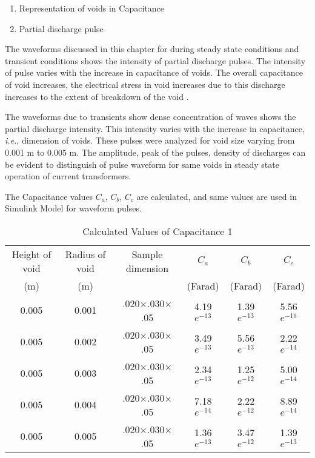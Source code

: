 \begin{enumerate}
\item Representation of voids in Capacitance 
\item Partial discharge pulse 
\end{enumerate}

The waveforms discussed in this chapter for during steady state conditions and transient conditions shows the intensity of partial discharge pulses. The intensity of pulse varies with the increase in capacitance of voids. The overall capacitance of void increases, the electrical stress in void increases due to this discharge increases to the extent of breakdown of the void \cite{bengtsson1997procedure}.

The waveforms due to transients show dense concentration of waves shows the partial discharge intensity. This intensity varies with the increase in capacitance, \textit{i.e.}, dimension of voids. These pulses were analyzed for void size varying from 0.001 m to 0.005 m. The amplitude, peak of the pulses, density of discharges can be evident to distinguish of pulse waveform for same voids in steady state operation of current transformers. 

The Capacitance values $C_a$, $C_b$, $C_c$ are calculated, and same values are used in Simulink Model for waveform pulses.

\begin{table}[h!]
\caption{Calculated Values of Capacitance 1}
\label{table:Calculated Values of Capacitance 1}
\centering
\begin{tabular}{|c|c|c|c|c|c|}
\hline 
Height of void 	&Radius of void &Sample dimension 				&$C_a$			&$C_b$			&$C_c$         \\ 
	(m)			&	(m) 		&								&(Farad) 		&(Farad) 		&(Farad)       \\ \hline \hline
0.005			&0.001			&.020$\times$.030$\times$.05 	&4.19$e^{-13}$	&1.39$e^{-13}$	&5.56$e^{-15}$ \\ \hline
0.005			&0.002			&.020$\times$.030$\times$.05 	&3.49$e^{-13}$	&5.56$e^{-13}$	&2.22$e^{-14}$ \\ \hline
0.005			&0.003			&.020$\times$.030$\times$.05 	&2.34$e^{-13}$	&1.25$e^{-12}$	&5.00$e^{-14}$ \\ \hline
0.005			&0.004			&.020$\times$.030$\times$.05 	&7.18$e^{-14}$	&2.22$e^{-12}$	&8.89$e^{-14}$ \\ \hline
0.005			&0.005			&.020$\times$.030$\times$.05 	&1.36$e^{-13}$	&3.47$e^{-12}$	&1.39$e^{-13}$ \\ \hline
\end{tabular} 
\end{table}

